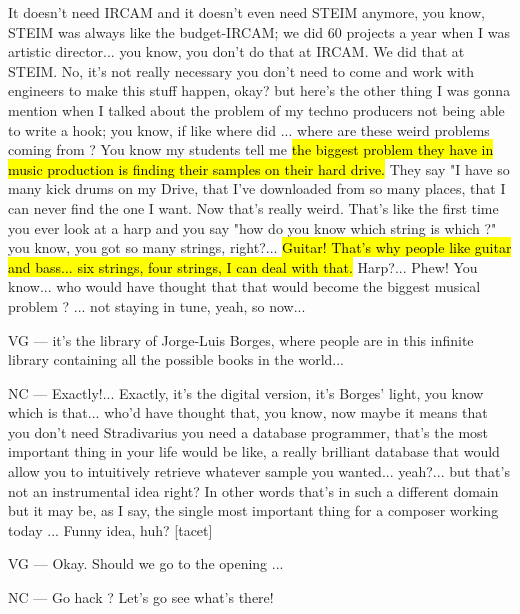 It doesn't need IRCAM and it doesn't even need STEIM anymore, you know, STEIM was always like the budget-IRCAM; we did 60 projects a year when I was artistic director... you know, you don't do that at IRCAM. We did that at STEIM. No, it's not really necessary you don't need to come and work with engineers to make this stuff happen, okay? but here's the other thing I was gonna mention when I talked about the problem of my techno producers not being able to write a hook; you know, if like where did ... where are these weird problems coming from ? You know my students tell me \hl{the biggest problem they have in music production is finding their samples on their hard drive.} They say "I have so many kick drums on my Drive, that I've downloaded from so many places, that I can never find the one I want. Now that's really weird. That's like the first time you ever look at a harp and you say "how do you know which string is which ?" you know, you got so many strings, right?... \hl{Guitar! That's why people like guitar and bass... six strings, four strings, I can deal with that.} Harp?... Phew! You know... who would have thought that that would become the biggest musical problem ? ... not staying in tune, yeah, so now... 

VG — it's the library of Jorge-Luis Borges,  where people are in this infinite library containing all the possible  books in the world... 

NC — Exactly!... Exactly, it's the digital version, it's Borges' light, you know which is that... who'd have thought that, you know,  now maybe it means that you don't need Stradivarius you need a database programmer, that's the most important thing in your life would be like, a really brilliant database that would allow you to intuitively retrieve whatever sample you wanted... yeah?... but that's not an instrumental  idea right? In other words that's in such a different domain but it may be, as I say, the single most important thing for a composer working today ... Funny idea, huh? [tacet] 

VG — Okay. Should we go to the opening ... 

NC — Go hack ? Let's go see what's there! 
